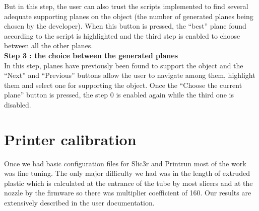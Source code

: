 \documentclass{report}
\begin{document}
But in this step, the user can also trust the scripts implemented to find several adequate supporting planes on the object (the number of generated planes being chosen by the developer). When this button is pressed, the ``best'' plane found according to the script is highlighted and the third step is enabled to choose between all the other planes.\\

\textbf{Step 3 : the choice between the generated planes}\\ 

In this step, planes have previously been found to support the object and the ``Next'' and ``Previous'' buttons allow the user to navigate among them, highlight them and select one for supporting the object. Once the ``Choose the current plane'' button is pressed, the step 0 is enabled again while the third one is disabled. 

\chapter{Printer calibration}
Once we had basic configuration files for Slic3r and Printrun most of the work was fine tuning. The only major difficulty we had was in the length of extruded plastic which is calculated at the entrance of the tube by most slicers and at the nozzle by the firmware so there was multiplier coefficient of 160. Our results are extensively described in the user documentation.\\

\bigskip
\end{document}
